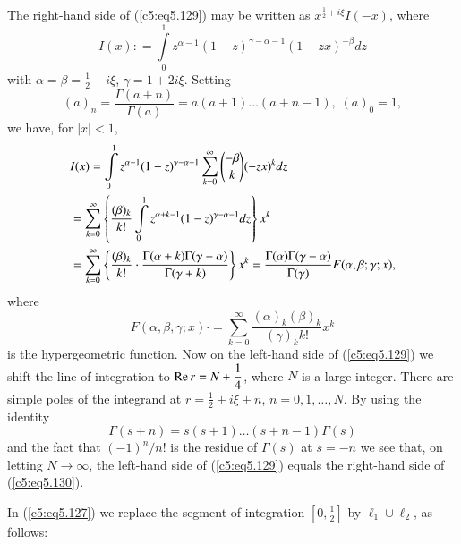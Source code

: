 The right-hand side of (\ref{c5:eq5.129}) may be written as
$x^{\frac{1}{2} + i \xi} I(-x)$, where 
$$
I(x) : = \int\limits^1_0 z^{\alpha-1} (1-z)^{\gamma -\alpha-1}
(1-zx)^{-\beta} dz 
$$
with $\alpha = \beta =\frac{1}{2} + i \xi$, $\gamma =1+ 2 i
\xi$. Setting 
$$
(a)_n = \frac{\Gamma (a+n)}{\Gamma (a)} = a(a+1) \ldots (a+ n -1), \;
(a)_0 =1,  
$$
we have, for $|x| < 1$,
\begin{align}
& I(x) = \int\limits^1_0 z^{\alpha-1} (1-z)^{\gamma -\alpha-1}
  \sum\limits^\infty_{k=0} \binom{-\beta}{k} (-zx)^k dz
 \label{c5:eq5.130}\\ 
& = \sum\limits^\infty_{k=0} \left\{\frac{(\beta)_k}{k!} \int\limits^1_0 z^{\alpha+k-1} (1-z)^{\gamma -\alpha-1} dz \right\} x^k\notag\\
& = \sum\limits^\infty_{k=0} \left\{ \frac{(\beta)_k}{k!} \cdot
 \frac{\Gamma(\alpha+k ) \Gamma (\gamma - \alpha)}{\Gamma (\gamma +
   k)} \right\} x^k = \frac{\Gamma(\alpha) \Gamma (\gamma -
   \alpha)}{\Gamma (\gamma)} F (\alpha, \beta; \gamma ;x),\notag 
\end{align}
where
$$
F(\alpha, \beta, \gamma;x) \cdot = \sum\limits^\infty_{k=0}
\frac{(\alpha)_k (\beta)_k}{(\gamma)_k k!} x^k 
$$\pageoriginale
is the hypergeometric function. Now on the left-hand side of
(\ref{c5:eq5.129}) we shift the line of integration to $\operatorname{Re} r = N +
\dfrac{1}{4}$, where $N$ is a large integer. There are simple poles of
the integrand at $r =\frac{1}{2} + i \xi + n$, $n = 0,1,\ldots, N$. By
using the identity 
$$
\Gamma (s+n) = s(s+1) \ldots (s+n-1) \Gamma (s)
$$
and the fact that $(-1)^n/n!$ is the residue of $\Gamma (s)$ at $s = -
n$ we see that, on letting $N \to \infty$, the left-hand side of
(\ref{c5:eq5.129}) equals the right-hand side of (\ref{c5:eq5.130}). 

In (\ref{c5:eq5.127}) we replace the segment of integration
$[0,\frac{1}{2}]$ by $\ell_1 \cup \ell_2$, as follows: 

